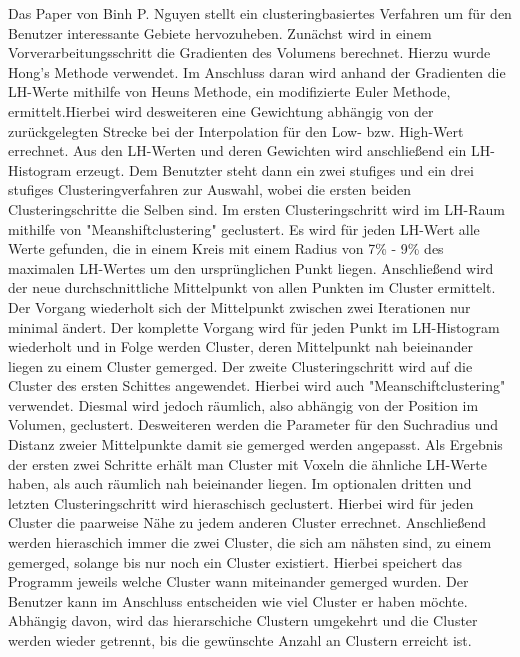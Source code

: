 Das Paper von Binh P. Nguyen \cite{nguyen2012clustering} stellt ein clusteringbasiertes Verfahren um für den Benutzer interessante Gebiete hervozuheben.
Zunächst wird in einem Vorverarbeitungsschritt die Gradienten des Volumens berechnet. Hierzu wurde Hong's Methode \cite{hong2003method} verwendet. Im Anschluss daran wird anhand der Gradienten die LH-Werte mithilfe von Heuns Methode, ein modifizierte Euler Methode, ermittelt.Hierbei wird desweiteren eine Gewichtung abhängig von der zurückgelegten Strecke bei der Interpolation für den Low- bzw. High-Wert errechnet. Aus den LH-Werten und deren Gewichten wird anschließend ein LH-Histogram erzeugt.
\newline
Dem Benutzter steht dann ein zwei stufiges und ein drei stufiges Clusteringverfahren zur Auswahl, wobei die ersten beiden Clusteringschritte die Selben sind. 
Im ersten Clusteringschritt wird im LH-Raum mithilfe von "Meanshiftclustering" geclustert. Es wird für jeden LH-Wert alle Werte gefunden, die in einem Kreis mit einem Radius von 7\% - 9\%  des maximalen LH-Wertes um den ursprünglichen Punkt liegen. Anschließend wird der neue durchschnittliche Mittelpunkt von allen Punkten im Cluster ermittelt. Der Vorgang wiederholt sich der Mittelpunkt zwischen zwei Iterationen nur minimal ändert. Der komplette Vorgang wird für jeden Punkt im LH-Histogram wiederholt und in Folge werden Cluster, deren Mittelpunkt nah beieinander liegen zu einem Cluster gemerged.
\newline
Der zweite Clusteringschritt wird auf die Cluster des ersten Schittes angewendet. Hierbei wird auch "Meanschiftclustering" verwendet. Diesmal wird jedoch räumlich, also abhängig von der Position im Volumen, geclustert. Desweiteren werden die Parameter für den Suchradius und Distanz zweier Mittelpunkte damit sie gemerged werden angepasst.
\newline
Als Ergebnis der ersten zwei Schritte erhält man Cluster mit Voxeln die ähnliche LH-Werte haben, als auch räumlich nah beieinander liegen.
\newline
Im optionalen dritten und letzten Clusteringschritt wird hieraschisch geclustert. Hierbei wird für jeden Cluster die paarweise Nähe zu jedem anderen Cluster errechnet. Anschließend werden hieraschich immer die zwei Cluster, die sich am nähsten sind, zu einem gemerged, solange bis nur noch ein Cluster existiert.  Hierbei speichert das Programm jeweils welche Cluster wann miteinander gemerged wurden. Der Benutzer kann im Anschluss entscheiden wie viel Cluster er haben möchte. Abhängig davon, wird das hierarschiche Clustern umgekehrt und die Cluster werden wieder getrennt, bis die gewünschte Anzahl an Clustern erreicht ist.



